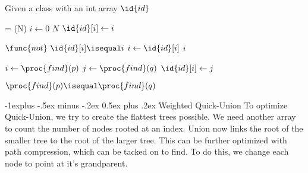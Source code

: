 \documentclass[letterpaper, 8pt]{extarticle}
\makeatletter
\renewcommand{\subsection}{\@startsection{subsection}{2}{0mm}%
                                {-1explus -.5ex minus -.2ex}%
                                {0.5ex plus .2ex}%
                                {\normalfont\small\bfseries}}
\makeatother
\begin{document}
\begin{multicols*}{5}
  Given a class with an int array $\id{id}$
  \begin{codebox}
    \li {} = (N)
    \li \For $i \gets 0$ \To $N$
    \li   \Do
    $\id{id}[i] \gets i$
    \End
  \end{codebox}
  \begin{codebox}
    \li \While $\func{not}\ \id{id}[i] \isequal i$
    \li   \Do
    $i \gets \id{id}[i]$
    \End
    \li \Return $i$
  \end{codebox}
  \begin{codebox}
    \li $i \gets \proc{find}(p)$
    \li $j \gets \proc{find}(q)$
    \li $\id{id}[i] \gets j$
  \end{codebox}
  \begin{codebox}
    \li \Return $\proc{find}(p) \isequal \proc{find}(q)$
  \end{codebox}

  \subsection{Weighted Quick-Union}
  To optimize Quick-Union, we try to create the flattest trees possible. We need another array to count the number of nodes rooted at an index. Union now links the root of the smaller tree to the root of the larger tree. This can be further optimized with path compression, which can be tacked on to find. To do this, we change each node to point at it's grandparent.



\end{multicols*}
\end{document}
